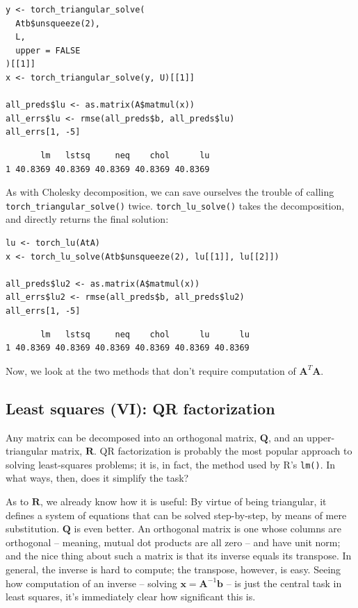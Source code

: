 \documentclass[
  letterpaper,
]{krantz}
\begin{document}
\begin{verbatim}
y <- torch_triangular_solve(
  Atb$unsqueeze(2),
  L,
  upper = FALSE
)[[1]]
x <- torch_triangular_solve(y, U)[[1]]

all_preds$lu <- as.matrix(A$matmul(x))
all_errs$lu <- rmse(all_preds$b, all_preds$lu)
all_errs[1, -5]
\end{verbatim}

\begin{verbatim}
       lm   lstsq     neq    chol      lu
1 40.8369 40.8369 40.8369 40.8369 40.8369
\end{verbatim}

As with Cholesky decomposition, we can save ourselves the trouble of
calling \texttt{torch\_triangular\_solve()} twice.
\texttt{torch\_lu\_solve()} takes the decomposition, and directly
returns the final solution:

\begin{verbatim}
lu <- torch_lu(AtA)
x <- torch_lu_solve(Atb$unsqueeze(2), lu[[1]], lu[[2]])

all_preds$lu2 <- as.matrix(A$matmul(x))
all_errs$lu2 <- rmse(all_preds$b, all_preds$lu2)
all_errs[1, -5]
\end{verbatim}

\begin{verbatim}
       lm   lstsq     neq    chol      lu      lu
1 40.8369 40.8369 40.8369 40.8369 40.8369 40.8369
\end{verbatim}

Now, we look at the two methods that don't require computation of
\(\mathbf{A}^T\mathbf{A}\).

\hypertarget{least-squares-vi-qr-factorization}{%
\subsection{\texorpdfstring{Least squares (VI): QR
factorization}{Least squares (VI): QR factorization}}\label{least-squares-vi-qr-factorization}}

Any matrix can be decomposed into an orthogonal matrix, \(\mathbf{Q}\),
and an upper-triangular matrix, \(\mathbf{R}\). QR factorization is
probably the most popular approach to solving least-squares problems; it
is, in fact, the method used by R's \texttt{lm()}. In what ways, then,
does it simplify the task?

As to \(\mathbf{R}\), we already know how it is useful: By virtue of
being triangular, it defines a system of equations that can be solved
step-by-step, by means of mere substitution. \(\mathbf{Q}\) is even
better. An orthogonal matrix is one whose columns are orthogonal --
meaning, mutual dot products are all zero -- and have unit norm; and the
nice thing about such a matrix is that its inverse equals its transpose.
In general, the inverse is hard to compute; the transpose, however, is
easy. Seeing how computation of an inverse -- solving
\(\mathbf{x}=\mathbf{A}^{-1}\mathbf{b}\) -- is just the central task in
least squares, it's immediately clear how significant this is.
\end{document}
